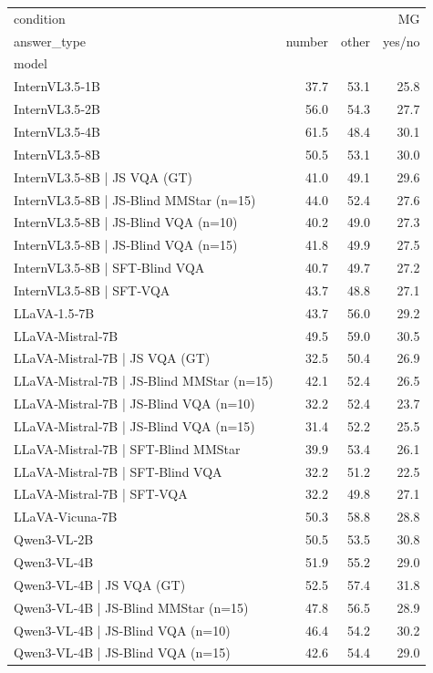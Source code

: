 \begin{tabular}{lrrr}
\toprule
condition & \multicolumn{3}{r}{MG} \\
answer_type & number & other & yes/no \\
model &  &  &  \\
\midrule
InternVL3.5‑1B & 37.7 & 53.1 & 25.8 \\
InternVL3.5‑2B & 56.0 & 54.3 & 27.7 \\
InternVL3.5‑4B & 61.5 & 48.4 & 30.1 \\
InternVL3.5‑8B & 50.5 & 53.1 & 30.0 \\
InternVL3.5‑8B | JS VQA (GT) & 41.0 & 49.1 & 29.6 \\
InternVL3.5‑8B | JS‑Blind MMStar (n=15) & 44.0 & 52.4 & 27.6 \\
InternVL3.5‑8B | JS‑Blind VQA (n=10) & 40.2 & 49.0 & 27.3 \\
InternVL3.5‑8B | JS‑Blind VQA (n=15) & 41.8 & 49.9 & 27.5 \\
InternVL3.5‑8B | SFT‑Blind VQA & 40.7 & 49.7 & 27.2 \\
InternVL3.5‑8B | SFT‑VQA & 43.7 & 48.8 & 27.1 \\
LLaVA‑1.5‑7B & 43.7 & 56.0 & 29.2 \\
LLaVA‑Mistral‑7B & 49.5 & 59.0 & 30.5 \\
LLaVA‑Mistral‑7B | JS VQA (GT) & 32.5 & 50.4 & 26.9 \\
LLaVA‑Mistral‑7B | JS‑Blind MMStar (n=15) & 42.1 & 52.4 & 26.5 \\
LLaVA‑Mistral‑7B | JS‑Blind VQA (n=10) & 32.2 & 52.4 & 23.7 \\
LLaVA‑Mistral‑7B | JS‑Blind VQA (n=15) & 31.4 & 52.2 & 25.5 \\
LLaVA‑Mistral‑7B | SFT‑Blind MMStar & 39.9 & 53.4 & 26.1 \\
LLaVA‑Mistral‑7B | SFT‑Blind VQA & 32.2 & 51.2 & 22.5 \\
LLaVA‑Mistral‑7B | SFT‑VQA & 32.2 & 49.8 & 27.1 \\
LLaVA‑Vicuna‑7B & 50.3 & 58.8 & 28.8 \\
Qwen3‑VL‑2B & 50.5 & 53.5 & 30.8 \\
Qwen3‑VL‑4B & 51.9 & 55.2 & 29.0 \\
Qwen3‑VL‑4B | JS VQA (GT) & 52.5 & 57.4 & 31.8 \\
Qwen3‑VL‑4B | JS‑Blind MMStar (n=15) & 47.8 & 56.5 & 28.9 \\
Qwen3‑VL‑4B | JS‑Blind VQA (n=10) & 46.4 & 54.2 & 30.2 \\
Qwen3‑VL‑4B | JS‑Blind VQA (n=15) & 42.6 & 54.4 & 29.0 \\

\end{tabular}
